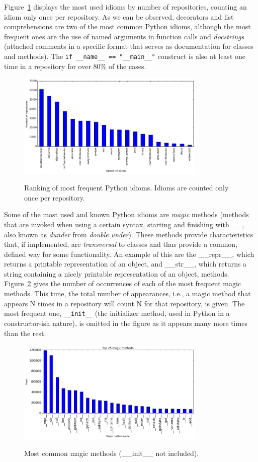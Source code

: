 \documentclass[conference]{IEEEtran}
\begin{document}
Figure~\ref{fig:idiom_ranking} displays the most used idioms by number of repositories, counting an idiom only once per repository. As we can be observed, decorators and list comprehensions are two of the most common Python idioms, although the most frequent ones are the use of named arguments in function calls and \emph{docstrings} (attached comments in a specific format that serves as documentation for classes and methods). The \verb|if __name__ == "__main__"| construct is also at least one time in a repository for over 80\% of the cases.

\begin{figure}[ht]
\centering
\includegraphics[width=90mm]{img/num_idiom_repo.png}
\label{fig:idiom_ranking}
\caption{Ranking of most frequent Python idioms. Idioms are counted only once per repository.}
\end{figure}

Some of the most used and known Python idioms are \emph{magic} methods (methods that are invoked when using a certain syntax, starting and finishing with \_\_, also known as \emph{dunder} from \emph{double under}). These methods provide characteristics that, if implemented, are \emph{transversal} to classes and thus provide a common, defined way for some functionality. An example of this are the \_\_repr\_\_, which returns a printable representation of an object, and \_\_str\_\_, which returns a string containing a nicely printable representation of an object, methods. Figure~\ref{fig:magic_ranking} gives the number of occurrences of each of the most frequent magic methods. This time, the total number of appearances, i.e., a magic method that appears N times in a repository will count N for that repository, is given. The most frequent one, \verb|__init__| (the initializer method, used in Python in a constructor-ish nature), is omitted in the figure as it appears many more times than the rest.

\begin{figure}[ht]
\centering
\includegraphics[width=90mm]{img/magic_methods.png}
\label{fig:magic_ranking}
\caption{Most common magic methods (\_\_init\_\_ not included).}
\end{figure}
\end{document}
